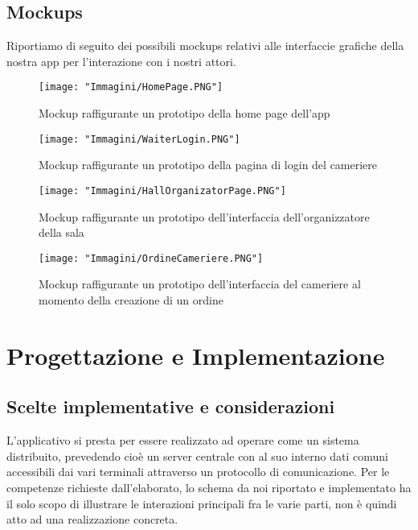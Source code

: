 \documentclass{article}
\begin{document}
\subsection{Mockups}
Riportiamo di seguito dei possibili mockups relativi alle interfaccie grafiche della nostra app per l'interazione con i nostri attori.

\begin{figure}[!h]
\centering
\texttt{[image: "Immagini/HomePage.PNG"]}
\caption{Mockup raffigurante un prototipo della home page dell'app}
\end{figure}

\newpage

\begin{figure}[!h]
\centering
\texttt{[image: "Immagini/WaiterLogin.PNG"]}
\caption{Mockup raffigurante un prototipo della pagina di login del cameriere}
\end{figure}

\begin{figure}[!h]
\centering
\texttt{[image: "Immagini/HallOrganizatorPage.PNG"]}
\caption{Mockup raffigurante un prototipo dell'interfaccia dell'organizzatore della sala}
\end{figure}

\newpage

\begin{figure}[!h]
\centering
\texttt{[image: "Immagini/OrdineCameriere.PNG"]}
\caption{Mockup raffigurante un prototipo dell'interfaccia del cameriere al momento della creazione di un ordine}
\end{figure}

\section{Progettazione e Implementazione}
\subsection{Scelte implementative e considerazioni}
L'applicativo si presta per essere realizzato ad operare come un sistema distribuito, prevedendo cio\`e un server centrale con al suo interno dati comuni accessibili dai vari terminali attraverso un protocollo di comunicazione. Per le competenze richieste dall'elaborato, lo schema da noi riportato e implementato ha il solo scopo di illustrare le interazioni principali fra le varie parti, non \`e quindi atto ad una realizzazione concreta.  
\end{document}
